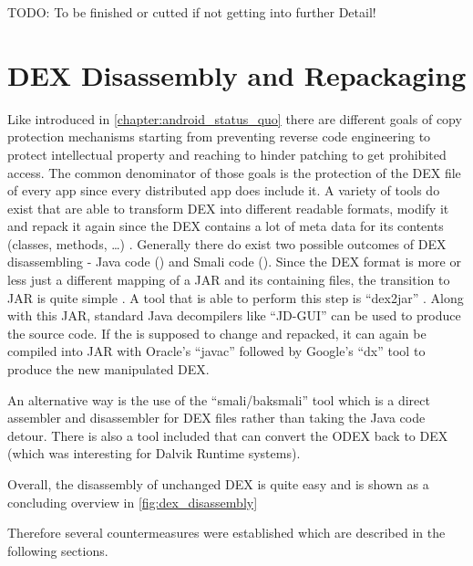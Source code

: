 TODO: To be finished or cutted if not getting into further Detail!



\section{DEX Disassembly and Repackaging}
Like introduced in \autoref{chapter:android_status_quo} there
are different goals of copy protection mechanisms starting from
preventing reverse code engineering to protect intellectual property
and reaching to hinder patching to get prohibited access.
The common denominator of those goals is the protection of
the DEX file of every app since every distributed app does include
it. A variety of tools do exist that
are able to transform DEX into different readable formats,
modify it and repack it again since the DEX contains
a lot of meta data for its contents (classes, methods, \ldots)
\parencite{dex}.
Generally there do exist two possible outcomes of DEX disassembling
- Java code () and Smali code ().
Since the DEX format is more or less just a different mapping of a
JAR and its containing  files, the transition to JAR
is quite simple \parencite{dvminternals}. A tool that is able to
perform this step is ``dex2jar'' \parencite{dex2jartool}.
Along with this JAR, standard Java decompilers like ``JD-GUI''
\parencite{jdtool} can be used to produce the  source code.
If the  is supposed to change and repacked, it can
again be compiled into JAR with Oracle's ``javac'' \parencite{javactool}
followed by Google's ``dx'' tool \parencite{dxtool}
to produce the new manipulated DEX.

An alternative way is the use of the ``smali/baksmali'' tool
\parencite{smalitool} which is a direct assembler and disassembler
for DEX files rather than taking the Java code detour. There is also
a tool included that can convert the ODEX back to DEX (which was interesting
for Dalvik Runtime systems).

Overall, the disassembly of unchanged DEX is quite easy and is shown
as a concluding overview in \autoref{fig:dex_disassembly}

Therefore several countermeasures were established which are
described in the following sections.

